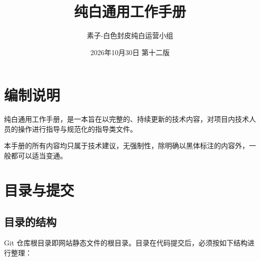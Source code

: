 \documentclass[fontset=fandol]{ctexrep}
\title{\bfseries 纯白通用工作手册}
\author{\kaishu 素子-白色封皮纯白运营小组}
\date{2026年10月30日 第十二版}
\begin{document}
\maketitle

\newpage

\tableofcontents

\newpage

\section{编制说明}

纯白通用工作手册，是一本旨在以完整的、持续更新的技术内容，对项目内技术人员的操作进行指导与规范化的指导类文件。

本手册的所有内容均只属于技术建议，无强制性，除明确以{\heiti 黑体}标注的内容外，一般都可以适当变通。

\section{目录与提交}

\subsection{目录的结构}

Git 仓库根目录即网站静态文件的根目录。目录在代码提交后，{\heiti 必须按如下结构进行整理：}
\end{document}
